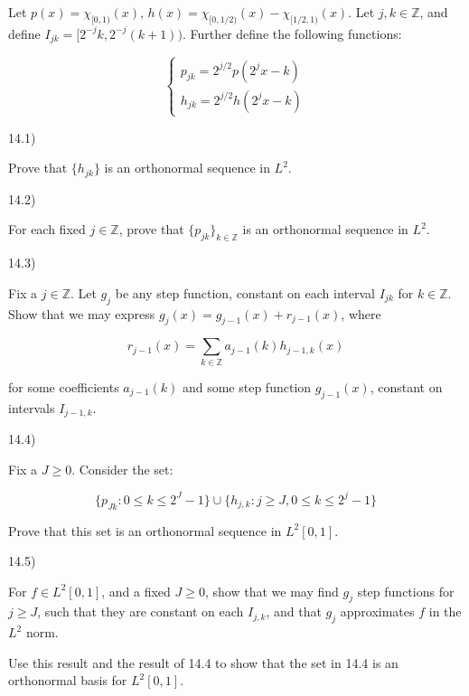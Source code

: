 \documentclass[10pt]{article}
\newenvironment{problem}[2][]{\begin{trivlist}
\item[\hskip \labelsep {\bfseries #1}\hskip \labelsep {\bfseries #2.}]}{\end{trivlist}}
\begin{document}
\begin{problem}{Question 14}

Let $p(x) = \chi_{[0,1)}(x)$, $h(x) = \chi_{[0,1/2)}(x) - \chi_{[1/2,1)}(x)$. Let $j, k \in\mathbb{Z}$, and define $I_{jk} = [2^{-j}k, 2^{-j}(k+1))$. Further define the following functions:

$$ \begin{cases} p_{jk} = 2^{j/2} p (2^{j} x - k) \\ h_{jk} = 2^{j/2} h (2^{j} x - k) \end{cases}$$

14.1)

Prove that $\{ h_{jk} \}$ is an orthonormal sequence in $L^2$.

14.2)

For each fixed $j \in \mathbb{Z}$, prove that $\{ p_{jk} \}_{k \in \mathbb{Z}}$ is an orthonormal sequence in $L^2$.  

14.3)

Fix a $j \in \mathbb{Z}$. Let $g_j$ be any step function, constant on each interval $I_{jk}$ for $k \in \mathbb{Z}$. Show that we may express $g_j(x) = g_{j-1}(x) + r_{j-1}(x)$, where

$$ r_{j-1}(x) = \sum_{k \in \mathbb{Z}} a_{j-1}(k)h_{j-1, k}(x) $$

for some coefficients $a_{j-1}(k)$ and some step function $g_{j-1}(x)$, constant on intervals $I_{j-1,k}$.

14.4)

Fix a $J \geq 0$. Consider the set:

$$ \{ p_{Jk} : 0 \leq k \leq 2^J - 1 \} \cup \{ h_{j,k} : j \geq J, 0 \leq k \leq 2^j - 1 \}$$

Prove that this set is an orthonormal sequence in $L^2[0,1]$.

14.5)

For $f \in L^2[0,1]$, and a fixed $J \geq 0$, show that we may find $g_j$ step functions for $j \geq J$, such that they are constant on each $I_{j,k}$, and that $g_j$ approximates $f$ in the $L^2$ norm.

Use this result and the result of 14.4 to show that the set in 14.4 is an orthonormal basis for $L^2[0,1]$.


\end{problem}
\end{document}
